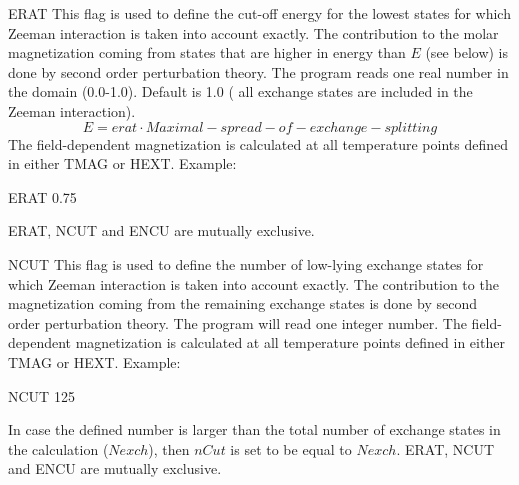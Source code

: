 \begin{keywordlist}
\item[ERAT]
This flag is used to define the cut-off energy for the lowest states for which Zeeman interaction
is taken into account exactly. The contribution to the molar magnetization coming from states that
are higher in energy than $E$ (see below) is done by second order perturbation theory.
The program reads one real number in the domain (0.0-1.0). Default is 1.0 ( all exchange states are
included in the Zeeman interaction).
\begin{displaymath}
E=  erat \cdot Maximal-spread-of-exchange-splitting
\end{displaymath}
The field-dependent magnetization is calculated at all temperature points defined in either TMAG or HEXT.
Example:
\begin{inputlisting}
ERAT
0.75
\end{inputlisting}
ERAT, NCUT and ENCU are mutually exclusive.


\item[NCUT]
This flag is used to define the number of low-lying exchange states for which Zeeman interaction is taken into
account exactly. The contribution to the magnetization coming from the remaining exchange states is done by second
order perturbation theory. The program will read one integer number. The field-dependent magnetization is calculated at all temperature points defined in either TMAG or HEXT.
Example:
\begin{inputlisting}
NCUT
125
\end{inputlisting}
In case the defined number is larger than the total number of exchange states in the calculation ($Nexch$), then $nCut$ is set to be equal to $Nexch$.
ERAT, NCUT and ENCU are mutually exclusive.







\end{keywordlist}
